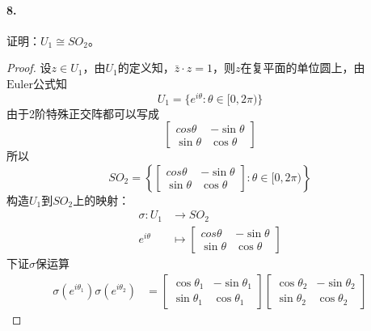 \documentclass[12pt, a4paper, oneside]{ctexart}
\begin{document}
\paragraph{8.}证明：$U_1\cong SO_2$。
\begin{proof}
    设$z\in U_1$，由$U_1$的定义知，$\bar{z}\cdot z = 1$，则$z$在复平面的单位圆上，由$\text{Euler公式}$知
    \begin{equation*}
        U_1 = \{e^{i\theta}:\theta\in[0,2\pi)\}
    \end{equation*}
    由于2阶特殊正交阵都可以写成
    \begin{equation*}
        \begin{bmatrix}
            cos\theta&-\sin\theta\\
            \sin\theta&\cos\theta
        \end{bmatrix}
    \end{equation*}
    所以
    \begin{equation*}
        SO_2 = \left\{
        \begin{bmatrix}
            cos\theta&-\sin\theta\\
            \sin\theta&\cos\theta
        \end{bmatrix}
        :\theta\in[0,2\pi)\right\}
    \end{equation*}
    构造$U_1$到$SO_2$上的映射：
    \begin{equation*}
        \begin{aligned}
            \sigma: U_1&\rightarrow SO_2\\
            e^{i\theta}&\mapsto
            \begin{bmatrix}
                cos\theta&-\sin\theta\\
                \sin\theta&\cos\theta
            \end{bmatrix}
        \end{aligned}
    \end{equation*}
    下证$\sigma$保运算
    \begin{equation*}
        \begin{aligned}
            \sigma(e^{i\theta_1})\sigma(e^{i\theta_2})&=\begin{bmatrix}
                \cos\theta_1&-\sin\theta_1\\
                \sin\theta_1&\cos\theta_1
            \end{bmatrix}\begin{bmatrix}
                \cos\theta_2&-\sin\theta_2\\
                \sin\theta_2&\cos\theta_2

\end{bmatrix}
\end{aligned}
\end{equation*}
\end{proof}
\end{document}
